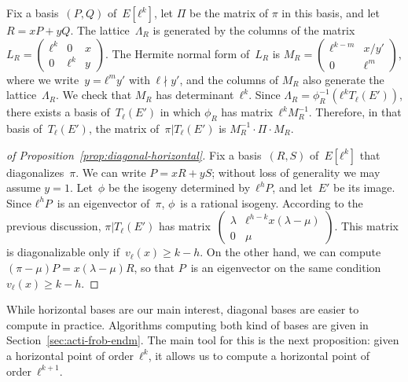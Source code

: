 \documentclass{lms}
\def\mat#1{\begin{pmatrix}#1\end{pmatrix}}
\def\smat#1{{\def\arraystretch{.7}\mat{#1}}}
\begin{document}
Fix a basis~$(P, Q)$ of~$E[ℓ^k]$, let $Π$ be the matrix of $π$
in this basis, and let~$R = x P + y Q$.
The lattice~$Λ_R$ is generated by the columns of the matrix
$L_R = \left (\begin{smallmatrix}ℓ^k & 0 & x\\0 & ℓ^k & y\end{smallmatrix} \right )$.
The Hermite normal form of~$L_R$
is 
$M_R = \left (\begin{smallmatrix}ℓ^{k-m} & x/y' \\ 0 & ℓ^m\end{smallmatrix}\right )$,
where we write~$y = ℓ^m y'$ with~$ℓ ∤y'$,
and the columns of $M_R$ also generate the lattice~$Λ_R$.
We check that $M_R$ has determinant~$ℓ^k$.
Since $Λ_R = ϕ_R^{-1} (ℓ^k T_{ℓ} (E'))$,
there exists a basis of~$T_ℓ(E')$
in which $ϕ_R$ has matrix~$ℓ^k M_R^{-1}$.
Therefore, in that basis of~$T_ℓ(E')$,
the matrix of~$π|T_ℓ(E')$ is $M_R^{-1} · Π · M_R^{}$.
\begin{proof}[of Proposition~\ref{prop:diagonal-horizontal}]
Fix a basis~$(R, S)$ of~$E[ℓ^k]$ that diagonalizes~$π$.
We can write $P = x R + y S$;
without loss of generality we may assume $y=1$.
Let~$ϕ$ be the isogeny determined by~$ℓ^h P$, and let~$E'$ be its image.
Since $ℓ^h P$~is an eigenvector of~$π$, $ϕ$~is a rational isogeny.
According to the previous discussion,
$π|T_ℓ(E')$ has matrix~$\left ( \begin{smallmatrix}λ& ℓ^{h-k} x (λ-μ)\\ 0&μ
\end{smallmatrix}\right )$.
This matrix is diagonalizable only if~$v_{ℓ}(x) ≥ k - h$.
On the other hand, we can compute~$(π - μ) P = x (λ - μ) R$,
so that $P$~is an eigenvector on the same condition~$v_{ℓ}(x) ≥ k-h$.
\end{proof}

While horizontal bases are our main interest,
diagonal bases are easier to compute in practice.
Algorithms computing both kind of bases
are given in Section~\ref{sec:acti-frob-endm}.
The main tool for this is the next proposition:
given a horizontal point of order~$ℓ^k$,
it allows us to compute a horizontal point of order~$ℓ^{k+1}$.
\end{document}
